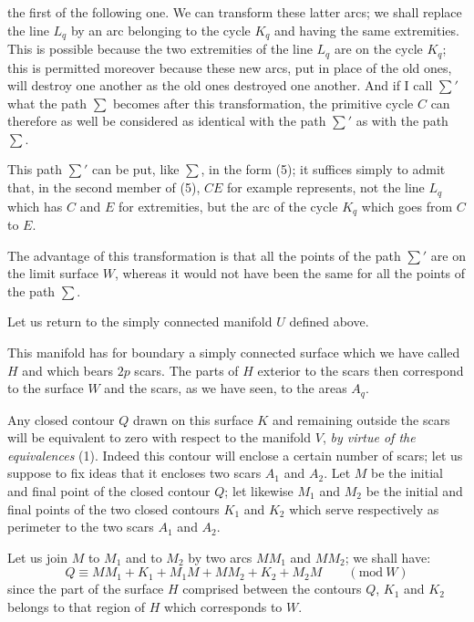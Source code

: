 \documentclass{article}
\begin{document}
the first of the following one. We can transform these latter arcs; we shall replace the line $L_{q}$ by an arc belonging to the cycle $K_{q}$ and having the same extremities. This is possible because the two extremities of the line $L_{q}$ are on the cycle $K_{q}$; this is permitted moreover because these new arcs, put in place of the old ones, will destroy one another as the old ones destroyed one another. And if I call $\displaystyle\sum'$ what the path $\displaystyle\sum$ becomes after this transformation, the primitive cycle $C$ can therefore as well be considered as identical with the path $\displaystyle\sum'$ as with the path $\displaystyle\sum$.

This path $\displaystyle\sum'$ can be put, like $\displaystyle\sum$, in the form (5); it suffices simply to admit that, in the second member of (5), $CE$ for example represents, not the line $L_{q}$ which has $C$ and $E$ for extremities, but the arc of the cycle $K_{q}$ which goes from $C$ to $E$.

The advantage of this transformation is that all the points of the path $\displaystyle\sum'$ are on the limit surface $W$, whereas it would not have been the same for all the points of the path $\displaystyle\sum$.

Let us return to the simply connected manifold $U$ defined above.

This manifold has for boundary a simply connected surface which we have called $H$ and which bears $2p$ scars. The parts of $H$ exterior to the scars then correspond to the surface $W$ and the scars, as we have seen, to the areas $A_{q}$.

Any closed contour $Q$ drawn on this surface $K$ and remaining outside the scars will be equivalent to zero with respect to the manifold $V$, \emph{by virtue of the equivalences} (1). Indeed this contour will enclose a certain number of scars; let us suppose to fix ideas that it encloses two scars $A_{1}$ and $A_{2}$. Let $M$ be the initial and final point of the closed contour $Q$; let likewise $M_{1}$ and $M_{2}$ be the initial and final points of the two closed contours $K_{1}$ and $K_{2}$ which serve respectively as perimeter to the two scars $A_{1}$ and $A_{2}$.

Let us join $M$ to $M_{1}$ and to $M_{2}$ by two arcs $MM_{1}$ and $MM_{2}$; we shall have:
\[ Q \equiv MM_{1} + K_{1} + M_{1}M + MM_{2} + K_{2} + M_{2}M \qquad (\text{mod}\ W) \]
since the part of the surface $H$ comprised between the contours $Q$, $K_{1}$ and $K_{2}$ belongs to that region of $H$ which corresponds to $W$.
\end{document}

